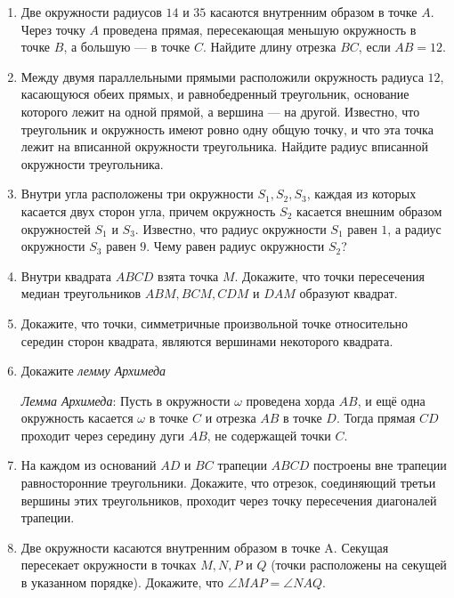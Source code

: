 \documentclass{article}
\begin{document}
\begin{enumerate}[label*=\protect\fbox{\arabic{enumi}}]

\item Две окружности радиусов $14$ и $35$ касаются внутренним образом в точке $A$. Через точку $A$ проведена прямая, пересекающая меньшую окружность в точке $B$, а большую — в точке $C$. Найдите длину отрезка $BC$, если $AB=12$.

\item Между двумя параллельными прямыми расположили окружность радиуса $12$, касающуюся обеих прямых, и равнобедренный треугольник, основание которого лежит на одной прямой, а вершина — на другой. Известно, что треугольник и окружность имеют ровно одну общую точку, и что эта точка лежит на вписанной окружности треугольника. Найдите радиус вписанной окружности треугольника.

\item Внутри угла расположены три окружности $S_1, S_2, S_3$, каждая из которых касается двух сторон угла, причем окружность $S_2$ касается внешним образом окружностей $S_1$ и $S_3$. Известно, что радиус окружности $S_1$ равен $1$, а радиус окружности $S_3$ равен $9$. Чему равен радиус окружности $S_2$?

\item Внутри квадрата $ABCD$ взята точка $M$. Докажите, что точки пересечения медиан треугольников  $ABM, BCM, CDM$ и $DAM$ образуют квадрат.

\item Докажите, что точки, симметричные произвольной точке относительно середин сторон квадрата, являются вершинами некоторого квадрата.

\item Докажите \textit{лемму Архимеда}

\textit{Лемма Архимеда}: Пусть в окружности $\omega$ проведена хорда $AB$, и ещё одна окружность касается $\omega$ в точке $C$ и отрезка $AB$ в точке $D$. Тогда прямая $CD$ проходит через середину дуги $AB$, не содержащей точки $C$. 

\item На каждом из оснований $AD$ и $BC$ трапеции $ABCD$ построены вне трапеции равносторонние треугольники. Докажите, что отрезок, соединяющий третьи вершины этих треугольников, проходит через точку пересечения диагоналей трапеции.

\item Две окружности касаются внутренним образом в точке A. Секущая пересекает окружности в точках $M, N, P$ и $Q$ (точки расположены на секущей в указанном порядке). Докажите, что $\angle MAP=\angle NAQ$.


\end{enumerate}
\end{document}
